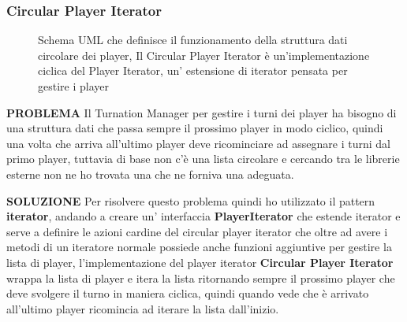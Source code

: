 \subsubsection{Circular Player Iterator}
\begin{figure}[H]
    \centering
    \caption{Schema UML che definisce il funzionamento della struttura dati circolare dei player, Il Circular Player Iterator è un'implementazione ciclica del Player Iterator,
    un' estensione di iterator pensata per gestire i player}
	\label{img:Iterator}
\end{figure}

\textbf{PROBLEMA}\newline
Il Turnation Manager per gestire i turni dei player ha bisogno di una struttura dati che passa sempre il prossimo player in modo ciclico, 
quindi una volta che arriva all'ultimo player deve ricominciare ad assegnare i turni dal primo player, tuttavia di base non c'è una lista circolare 
e cercando tra le librerie esterne non ne ho trovata una che ne forniva una adeguata.\newline

\textbf{SOLUZIONE}\newline
Per risolvere questo problema quindi ho utilizzato il pattern \textbf{iterator}, andando a creare un' interfaccia \textbf{PlayerIterator} che estende iterator 
e serve a definire le azioni cardine del circular player iterator che oltre ad avere i metodi di un iteratore normale possiede anche funzioni aggiuntive per gestire la lista di player,
l'implementazione del player iterator \textbf{Circular Player Iterator} wrappa la lista di player e itera la lista ritornando sempre il prossimo player 
che deve svolgere il turno in maniera ciclica, quindi quando vede che è arrivato all'ultimo player ricomincia ad iterare la lista dall'inizio.\newline

